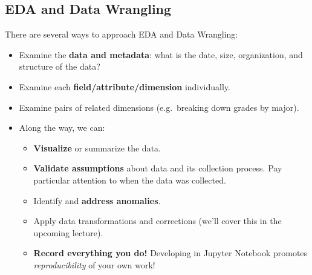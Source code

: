 \documentclass[
  letterpaper,
  DIV=11,
  numbers=noendperiod]{scrreprt}
\providecommand{\tightlist}{%
  \setlength{\itemsep}{0pt}\setlength{\parskip}{0pt}}\usepackage{longtable,booktabs,array}
\begin{document}
\hypertarget{eda-and-data-wrangling}{%
\subsection{EDA and Data Wrangling}\label{eda-and-data-wrangling}}

There are several ways to approach EDA and Data Wrangling:

\begin{itemize}
\tightlist
\item
  Examine the \textbf{data and metadata}: what is the date, size,
  organization, and structure of the data?
\item
  Examine each \textbf{field/attribute/dimension} individually.
\item
  Examine pairs of related dimensions (e.g.~breaking down grades by
  major).
\item
  Along the way, we can:

  \begin{itemize}
  \tightlist
  \item
    \textbf{Visualize} or summarize the data.
  \item
    \textbf{Validate assumptions} about data and its collection process.
    Pay particular attention to when the data was collected.
  \item
    Identify and \textbf{address anomalies}.
  \item
    Apply data transformations and corrections (we'll cover this in the
    upcoming lecture).
  \item
    \textbf{Record everything you do!} Developing in Jupyter Notebook
    promotes \emph{reproducibility} of your own work!
  \end{itemize}
\end{itemize}
\end{document}
